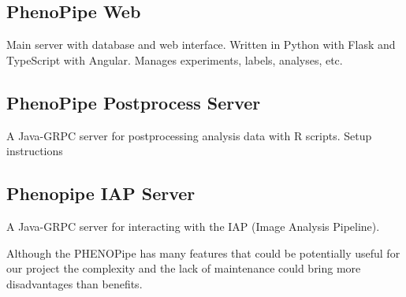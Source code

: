 \subsection{PhenoPipe Web}
Main server with database and web interface.\newline
Written in Python with Flask and TypeScript with Angular.\newline
Manages experiments, labels, analyses, etc.

\subsection{PhenoPipe Postprocess Server}
A Java-GRPC server for postprocessing analysis data with R scripts.\newline
Setup instructions

\subsection{Phenopipe IAP Server}
A Java-GRPC server for interacting with the IAP (Image Analysis Pipeline).

Although the PHENOPipe has many features that could be potentially useful for our project the complexity and the lack of maintenance could bring more disadvantages than benefits.
